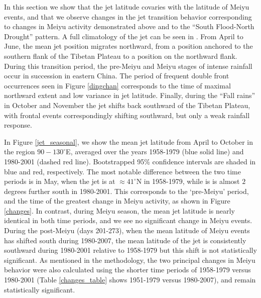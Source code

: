 \documentclass[draft,grl]{AGUTeX}
\begin{document}
\begin{article}
	In this section we show that the jet latitude covaries with the latitude of Meiyu events, and that we observe changes in the jet transition behavior corresponding to changes in Meiyu activity demonstrated above and to the ``South Flood-North Drought'' pattern. A full climatology of the jet can be seen in \citet{Schiemann2009}. From April to June, the mean jet position migrates northward, from a position anchored to the southern flank of the Tibetan Plateau to a position on the northward flank. During this transition period, the pre-Meiyu and Meiyu stages of intense rainfall occur in succession in eastern China. The period of frequent double front occurrences seen in Figure \ref{dingchan} corresponds to the time of maximal northward extent and low variance in jet latitude. Finally, during the ``Fall rains'' in October and November the jet shifts back southward of the Tibetan Plateau, with frontal events correspondingly shifting southward, but only a weak rainfall response.

	In Figure \ref{jet_seasonal}, we show the mean jet latitude from April to October in the region $90-130^\circ$E, averaged over the years 1958-1979 (blue solid line) and 1980-2001 (dashed red line). Bootstrapped 95\% confidence intervals are shaded in blue and red, respectively. The most notable difference between the two time periods is in May, when the jet is at $\approx 41^\circ$N in 1958-1979, while is is almost $2$ degrees further south in 1980-2001. This corresponds to the `pre-Meiyu' period, and the time of the greatest change in Meiyu activity, as shown in Figure \ref{changes}. In contrast, during Meiyu season, the mean jet latitude is nearly identical in both time periods, and we see no significant change in Meiyu events. During the post-Meiyu (days 201-273), when the mean latitude of Meiyu events has shifted south during 1980-2007, the mean latitude of the jet is consistently southward during 1980-2001 relative to 1958-1979 but this shift is not statistically significant. As mentioned in the methodology, the two principal changes in Meiyu behavior were also calculated using the shorter time periods of 1958-1979 versus 1980-2001 (Table \ref{changes_table} shows 1951-1979 versus 1980-2007), and remain statistically significant.


\end{article}
\end{document}
